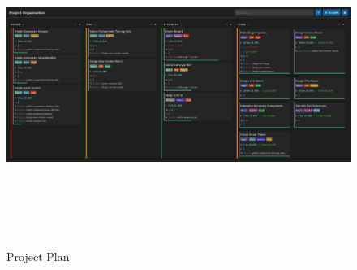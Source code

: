 \begin{figure}[t]
  \begin{minipage}[t]{\textwidth}
    \centering
    \includegraphics[width=\textwidth,height=10.5cm,keepaspectratio]{imgs/appendix/projectplan.jpg}
    \caption{Project Plan}
    \label{fig:projectplan}
  \end{minipage}
  \hfill 
\end{figure}

